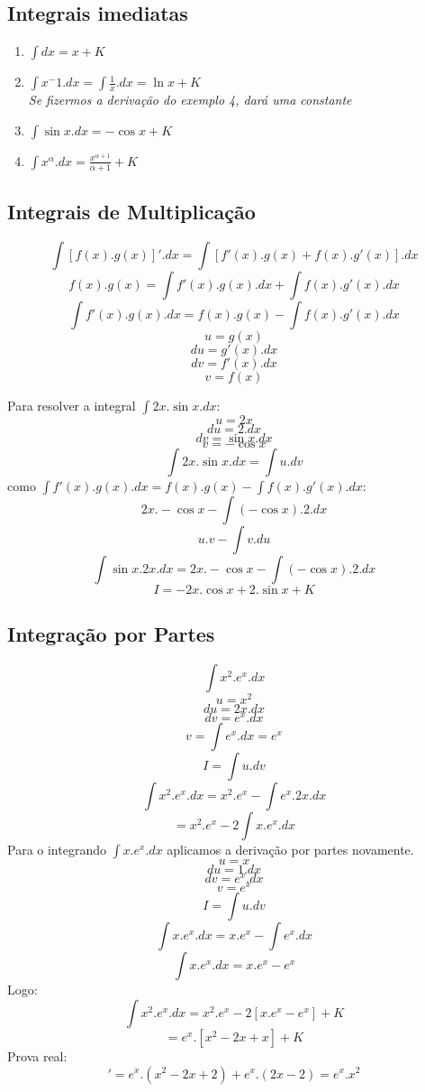 \documentclass{article}
\begin{document}
		\subsection{Integrais imediatas}
			\begin{enumerate}
				\item $\int dx = x+K$
				\item $\int x^-1.dx = \int \frac{1}{x}.dx = \ln x+K$ \\ \textit{Se fizermos a derivação do exemplo 4, dará uma constante}
				\item $\int \sin x . dx = -\cos x +K$
				\item $\int x^\alpha .dx = \frac{x^{\alpha+1}}{\alpha+1}+K$
			\end{enumerate}
		\subsection{Integrais de Multiplicação}
			$$\int [f(x).g(x)]'.dx = \int[f'(x).g(x)+f(x).g'(x)].dx$$
			$$f(x).g(x) = \int f'(x).g(x).dx + \int f(x).g'(x).dx$$
			$$\int f'(x).g(x).dx = f(x).g(x) - \int f(x).g'(x).dx$$
				$$u = g(x)$$
				$$du = g'(x).dx$$
				$$dv = f'(x).dx$$			
				$$v = f(x)$$
			
			
			Para resolver a integral $\int 2x. \sin x .dx$:
				$$u = 2x$$
				$$du = 2.dx$$
				$$dv = \sin x.dx$$
				$$v = -\cos x$$
			$$\int 2x. \sin x . dx = \int u . dv$$
			como $\int f'(x).g(x).dx = f(x).g(x)-\int f(x).g'(x).dx$:
			$$2x. - \cos x - \int ( - \cos x ).2.dx$$
			$$u.v- \int v.du$$
			$$\int \sin x.2x.dx = 2x. - \cos x - \int (- \cos x).2.dx$$
			$$I = -2x.\cos x +2.\sin x + K$$
			
		\subsection{Integração por Partes}
			$$\int x^2.e^x.dx$$
			$$u = x^2$$
			$$du = 2x.dx$$
			$$dv = e^x.dx$$
			$$v = \int e^x.dx = e^x$$
			$$I=\int u.dv$$
			$$\int x^2.e^x.dx = x^2.e^x-\int e^x.2x.dx$$
			$$=x^2.e^x-2\int x.e^x.dx$$
			Para o integrando $\int x.e^x.dx$ aplicamos a derivação por partes novamente.
			$$u = x$$
			$$du = 1.dx$$
			$$dv = e^x.dx$$
			$$v = e^x$$
			$$I = \int u . dv$$
			$$\int x.e^x.dx = x.e^x-\int e^x.dx$$
			$$\int x.e^x.dx = x.e^x-e^x$$
			Logo:
			$$\int x^2.e^x.dx = x^2.e^x-2[x.e^x-e^x]+K$$
			$$= e^x.[x^2-2x+x]+K$$
			Prova real:
			\begin{equation}
				[e^x.(x^2-2x+x)]'= e^x.(x^2-2x+2)+e^x.(2x-2)
				=e^x.x^2
			\end{equation}
			
\end{document}
